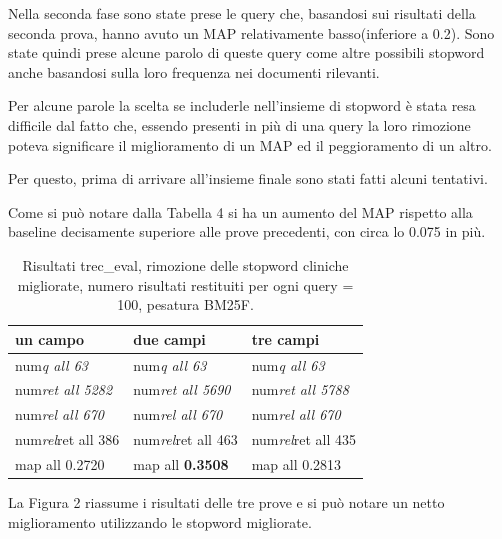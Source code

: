 \documentclass[runningheads]{llncs}
\begin{document}
Nella seconda fase sono state prese le query che, basandosi sui risultati della seconda prova, hanno avuto un MAP relativamente basso(inferiore a 0.2). Sono state quindi prese alcune parolo di queste query come altre possibili stopword anche basandosi sulla loro frequenza nei documenti rilevanti.

Per alcune parole la scelta se includerle nell'insieme di stopword \`e stata resa difficile dal fatto che, essendo presenti in pi\`u di una query la loro rimozione poteva significare il miglioramento di un MAP ed il peggioramento di un altro.

Per questo, prima di arrivare all'insieme finale sono stati fatti alcuni tentativi.




Come si pu\`o notare dalla Tabella 4 si ha un aumento del MAP rispetto alla baseline decisamente superiore alle prove precedenti, con circa lo 0.075 in pi\`u.
\begin{table}
\centering
\begin{tabular}{lll}
\hline
\textbf{ un campo }           & \textbf{ due campi }           & \textbf{ tre campi }            \\ \hline
 num\textit{q all 63 }       &  num\textit{q all 63 }       &  num\textit{q all 63 }        \\
 num\textit{ret all 5282 }  &  num\textit{ret all 5690 }  &  num\textit{ret all 5788 }   \\
 num\textit{rel all 670 }    &  num\textit{rel all 670 }    &  num\textit{rel all 670 }     \\
 num\textit{rel}ret all 386  &  num\textit{rel}ret all 463  &  num\textit{rel}ret all 435   \\
map all 0.2720               & map all \bf 0.3508               & map all 0.2813          \\ \hline
\end{tabular}

\caption{ Risultati trec\_eval, rimozione delle stopword cliniche migliorate, numero risultati restituiti per ogni query = 100, pesatura BM25F.}
\end{table}
\par

La Figura 2 riassume i risultati delle tre prove e si pu\`o notare un netto miglioramento utilizzando le stopword migliorate.
\end{document}
